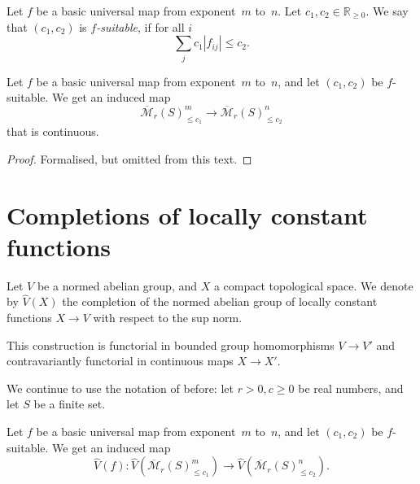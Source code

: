 \begin{definition}
  \label{basic_suitable}
  \leanok
  Let $f$ be a basic universal map from exponent~$m$ to~$n$.
  Let $c_1, c_2 \in \mathbb R_{\ge 0}$.
  We say that $(c_1, c_2)$ is \emph{$f$-suitable}, if for all $i$
  \[
    \sum_j c_1|f_{ij}| \le c_2.
  \]
\end{definition}

\begin{lemma}
  \label{basic_eval_Mbar_le_ctu}
  \leanok
  Let $f$ be a basic universal map from exponent~$m$ to~$n$,
  and let $(c_1, c_2)$ be $f$-suitable.
  We get an induced map
  \[
    \overline{\mathcal M}_r(S)_{\le c_1}^m \to \overline{\mathcal M}_r(S)_{\le c_2}^n
  \]
  that is continuous.
\end{lemma}

\begin{proof}
  \leanok
  Formalised, but omitted from this text.
\end{proof}

\section{Completions of locally constant functions}

\begin{definition}
  \label{Vhat}
  \leanok
  Let $V$ be a normed abelian group, and $X$ a compact topological space.
  We denote by $\hat V(X)$ the completion
  of the normed abelian group of locally constant functions $X \to V$
  with respect to the sup norm.

  This construction is functorial in bounded group homomorphisms $V \to V'$
  and contravariantly functorial in continuous maps $X \to X'$.
\end{definition}

We continue to use the notation of before:
let $r > 0, c \ge 0$ be real numbers, and let $S$ be a finite set.

\begin{definition}
  \label{Vhat_basic_eval_Mbar}
  \leanok
  Let $f$ be a basic universal map from exponent~$m$ to~$n$,
  and let $(c_1, c_2)$ be $f$-suitable.
  We get an induced map
  \[
    \hat V(f) \colon
    \hat V(\overline{\mathcal M}_r(S)_{\le c_1}^m) \to
    \hat V(\overline{\mathcal M}_r(S)_{\le c_2}^n).
  \]
\end{definition}

